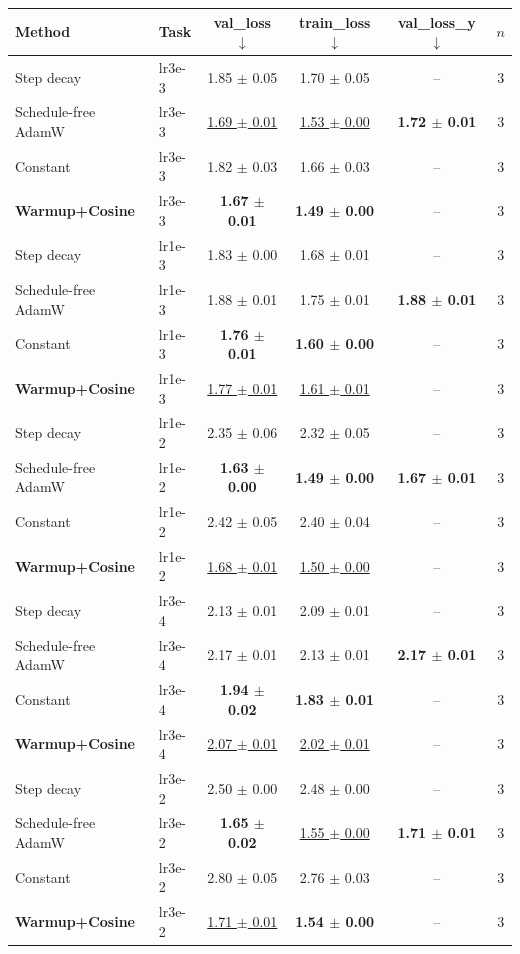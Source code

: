 \begin{tabular}{llcccc}
\toprule
Method & Task & val\_loss $\downarrow$ & train\_loss $\downarrow$ & val\_loss\_y $\downarrow$ & $n$ \\
\midrule
Step decay & lr3e-3 & 1.85 $\pm$ 0.05 & 1.70 $\pm$ 0.05 & -- & 3 \\
Schedule-free AdamW & lr3e-3 & \underline{1.69 $\pm$ 0.01} & \underline{1.53 $\pm$ 0.00} & \textbf{1.72 $\pm$ 0.01} & 3 \\
Constant & lr3e-3 & 1.82 $\pm$ 0.03 & 1.66 $\pm$ 0.03 & -- & 3 \\
\textbf{Warmup+Cosine} & lr3e-3 & \textbf{1.67 $\pm$ 0.01} & \textbf{1.49 $\pm$ 0.00} & -- & 3 \\
\midrule
Step decay & lr1e-3 & 1.83 $\pm$ 0.00 & 1.68 $\pm$ 0.01 & -- & 3 \\
Schedule-free AdamW & lr1e-3 & 1.88 $\pm$ 0.01 & 1.75 $\pm$ 0.01 & \textbf{1.88 $\pm$ 0.01} & 3 \\
Constant & lr1e-3 & \textbf{1.76 $\pm$ 0.01} & \textbf{1.60 $\pm$ 0.00} & -- & 3 \\
\textbf{Warmup+Cosine} & lr1e-3 & \underline{1.77 $\pm$ 0.01} & \underline{1.61 $\pm$ 0.01} & -- & 3 \\
\midrule
Step decay & lr1e-2 & 2.35 $\pm$ 0.06 & 2.32 $\pm$ 0.05 & -- & 3 \\
Schedule-free AdamW & lr1e-2 & \textbf{1.63 $\pm$ 0.00} & \textbf{1.49 $\pm$ 0.00} & \textbf{1.67 $\pm$ 0.01} & 3 \\
Constant & lr1e-2 & 2.42 $\pm$ 0.05 & 2.40 $\pm$ 0.04 & -- & 3 \\
\textbf{Warmup+Cosine} & lr1e-2 & \underline{1.68 $\pm$ 0.01} & \underline{1.50 $\pm$ 0.00} & -- & 3 \\
\midrule
Step decay & lr3e-4 & 2.13 $\pm$ 0.01 & 2.09 $\pm$ 0.01 & -- & 3 \\
Schedule-free AdamW & lr3e-4 & 2.17 $\pm$ 0.01 & 2.13 $\pm$ 0.01 & \textbf{2.17 $\pm$ 0.01} & 3 \\
Constant & lr3e-4 & \textbf{1.94 $\pm$ 0.02} & \textbf{1.83 $\pm$ 0.01} & -- & 3 \\
\textbf{Warmup+Cosine} & lr3e-4 & \underline{2.07 $\pm$ 0.01} & \underline{2.02 $\pm$ 0.01} & -- & 3 \\
\midrule
Step decay & lr3e-2 & 2.50 $\pm$ 0.00 & 2.48 $\pm$ 0.00 & -- & 3 \\
Schedule-free AdamW & lr3e-2 & \textbf{1.65 $\pm$ 0.02} & \underline{1.55 $\pm$ 0.00} & \textbf{1.71 $\pm$ 0.01} & 3 \\
Constant & lr3e-2 & 2.80 $\pm$ 0.05 & 2.76 $\pm$ 0.03 & -- & 3 \\
\textbf{Warmup+Cosine} & lr3e-2 & \underline{1.71 $\pm$ 0.01} & \textbf{1.54 $\pm$ 0.00} & -- & 3 \\
\midrule
\bottomrule
\end{tabular}
